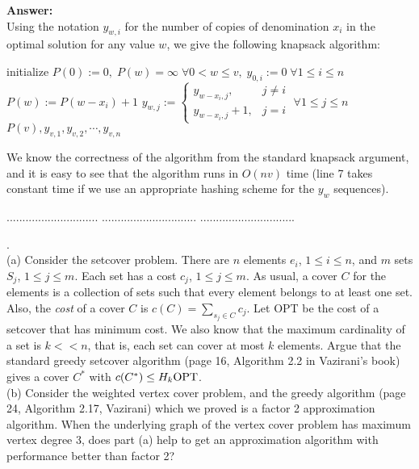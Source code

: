 \documentclass[a4paper,11pt]{article}
\begin{document}
\noindent
{\bf Answer:} \\
Using the notation $y_{w, i}$ for the number of copies of denomination $x_i$ in the optimal solution for any value $w$, we give the following knapsack algorithm:
\begin{algorithm}[H] {\begin{algorithmic}[1]
        \State initialize $P(0) := 0, \; P(w) = \infty \; \forall 0 < w \leq v, \; y_{0, i} := 0 \; \forall 1 \leq i \leq n$
                    \State $P(w) := P(w - x_i) + 1$
                    \State $y_{w, j} := \begin{cases}
                        y_{w - x_i, j}, &j \neq i \\
                        y_{w - x_i, j} + 1, &j = i
                    \end{cases} \; \forall 1 \leq j \leq n$
                \EndIf
            \EndFor
        \EndFor
        \State \Return $P(v), y_{v, 1}, y_{v, 2}, \cdots, y_{v, n}$
    \EndFunction
\end{algorithmic}} \end{algorithm}
We know the correctness of the algorithm from the standard knapsack argument, and it is easy to see that the algorithm runs in $O(nv)$ time (line 7 takes constant time if we use an appropriate hashing scheme for the $y_w$ sequences).



\pagebreak
{} $.............................$
 $..............................$
          $..............................$\\

\bigskip

.\\
(a) Consider the setcover problem. There are $n$ elements $e_i$, $1 \leq i \leq n$, and $m$ sets 
$S_j$, $1 \leq j \leq m$. Each set has a cost $c_j$, $1 \leq j \leq m$. 
As usual, a cover $C$ for the elements is a collection of sets such that every element belongs to at least one set. 
Also, the {\em cost} of a cover $C$ is $c(C) = \sum_{s_j \in C} c_j$.
Let OPT be the cost of a setcover that has minimum cost. 
We also know that the maximum cardinality of a set is $k << n$, that is, 
each set can cover at most $k$ elements. 
Argue that the standard greedy setcover algorithm (page 16, Algorithm 2.2 in Vazirani's book) 
gives a cover $C^*$ with  $c(C^*) \leq H_k {\rm OPT}$.\\
(b) Consider the weighted vertex cover problem, and the greedy algorithm (page 24, Algorithm 2.17, Vazirani) 
which we proved is a factor 2 approximation algorithm. When the underlying graph of the vertex cover problem 
has maximum vertex degree 3, does part (a)  help to get an approximation algorithm 
with performance better than factor 2? \\
\end{document}
